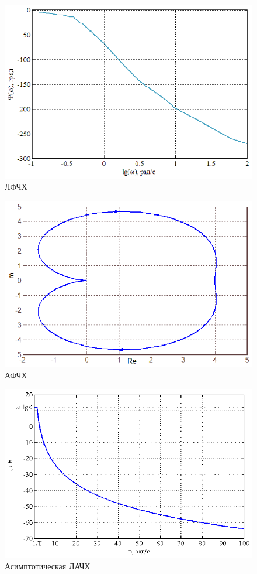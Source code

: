 \documentclass[a4paper,12pt]{article} %
\begin{document}
\begin{figure}[H]
	\centering
	\includegraphics[width=1\linewidth]{scheme/Lfch2.eps}
	\caption{ЛФЧХ}
\end{figure}
\begin{figure}[H]
	\centering
	\includegraphics[width=1\linewidth]{scheme/Afch2.eps}
	\caption{АФЧХ}
\end{figure}
\begin{figure}[H]
	\centering
	\includegraphics[width=1\linewidth]{scheme/Asi2.eps}
	\caption{Асимптотическая ЛАЧХ}
\end{figure}
\end{document}
